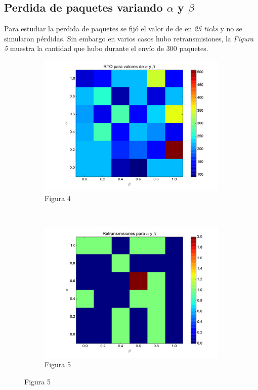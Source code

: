     \subsection{Perdida de paquetes variando $\alpha$ y $\beta$}
        Para estudiar la perdida de paquetes se fij\'o el valor de 
        de \rto{} en \textit{25 ticks} y no se simularon p\'erdidas.
        Sin embargo en varios casos hubo retransmisiones, la 
        \textit{Figura 5} muestra la cantidad que hubo durante el env\'io de 300
		paquetes.        
    \begin{figure}[H]
	    \center
	    \begin{subfigure}{0.45\textwidth}
		    \includegraphics[width=1.0\textwidth]{imagenes/rto_vs_alphaBeta.pdf}
		    \caption*{Figura 4}
	    \end{subfigure}
	    ~
	    \begin{subfigure}{0.45\textwidth}
		    \includegraphics[width=1.0\textwidth]{imagenes/retransmisiones_300.pdf}
		    \caption*{Figura 5}
	    \end{subfigure}
	
    \end{figure}

